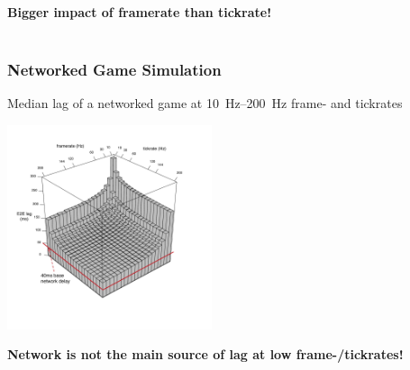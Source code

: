 \documentclass{UDEbeamerEN}
\begin{document}
\begin{frame}
\begin{overprint}
{\begin{center}
				\textbf{Bigger impact of framerate than tickrate!}\\
				~

			\end{center}}
	\end{overprint}


\end{frame}


\begin{frame}
	\frametitle{Networked Game Simulation}

	\begin{center}
	\vspace{-9mm}
		Median lag of a networked game at \SIrange{10}{200}{\hertz} frame- and tickrates%

		\includegraphics[height=6cm]{extras/e2e-lag-3dbars-annotated.pdf}
		\vspace{-10mm}

		\textbf{Network is not the main source of lag at low frame-/tickrates!}

	\end{center}

\end{frame}
\end{document}
